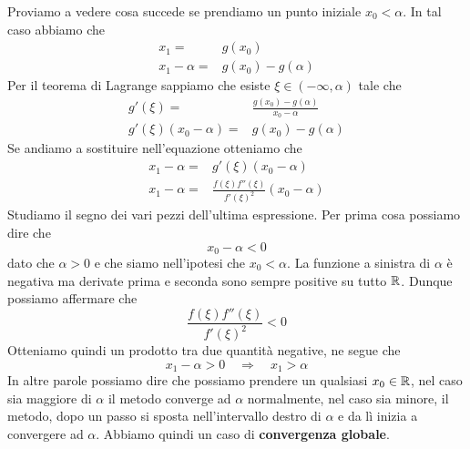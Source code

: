 \begin{example}
	Proviamo a vedere cosa succede se prendiamo un punto iniziale $x_0 < \alpha$. In tal caso abbiamo che
	\begin{align*}
		x_1 =          & g(x_0)             \\
		x_1 - \alpha = & g(x_0) - g(\alpha)
	\end{align*}
	Per il teorema di Lagrange sappiamo che esiste $\xi \in (-\infty, \alpha)$ tale che
	\begin{align*}
		g'(\xi) =                & \frac{g(x_0) - g(\alpha)}{x_0 - \alpha} \\
		g'(\xi) (x_0 - \alpha) = & g(x_0) - g(\alpha)
	\end{align*}
	Se andiamo a sostituire nell'equazione otteniamo che
	\begin{align*}
		x_1 - \alpha = & g'(\xi) (x_0 - \alpha)                           \\
		x_1 - \alpha = & \frac{f(\xi) f''(\xi)}{f'(\xi)^2} (x_0 - \alpha)
	\end{align*}
	Studiamo il segno dei vari pezzi dell'ultima espressione. Per prima cosa possiamo dire che
	\[ x_0 - \alpha < 0 \]
	dato che $\alpha > 0$ e che siamo nell'ipotesi che $x_0 < \alpha$. La funzione a sinistra di $\alpha$ è
	negativa ma derivate prima e seconda sono sempre positive su tutto $\mathbb{R}$. Dunque possiamo affermare che
	\[ \frac{f(\xi) f''(\xi)}{f'(\xi)^2} < 0 \]
	Otteniamo quindi un prodotto tra due quantità negative, ne segue che
	\[ x_1 - \alpha > 0 \quad \Rightarrow \quad x_1 > \alpha \]
	In altre parole possiamo dire che possiamo prendere un qualsiasi $x_0 \in \mathbb{R}$, nel caso sia maggiore di
	$\alpha$ il metodo converge ad $\alpha$ normalmente, nel caso sia minore, il metodo, dopo un passo si sposta
	nell'intervallo destro di $\alpha$ e da lì inizia a convergere ad $\alpha$. Abbiamo quindi un caso di
	\textbf{convergenza globale}.
\end{example}
